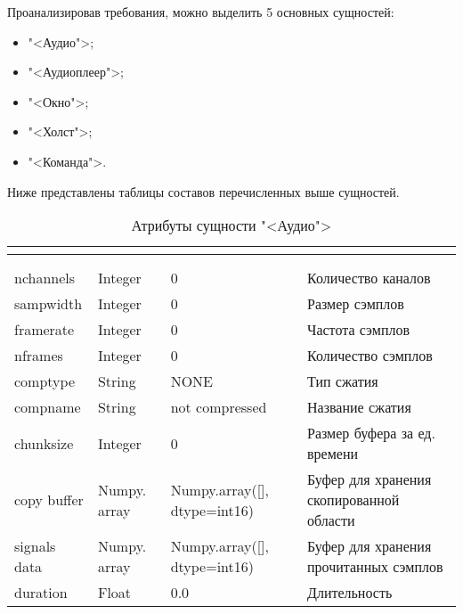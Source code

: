 Проанализировав требования, можно выделить 5 основных сущностей:
\begin{itemize}
	\item "<Аудио">;
	\item "<Аудиоплеер">;
	\item "<Окно">;
	\item "<Холст">;
	\item "<Команда">.
\end{itemize}

Ниже представлены таблицы составов перечисленных выше сущностей.

\begin{xltabular}{\textwidth}{|p{2.1cm}|p{2cm}|l|X|}
	\caption{Атрибуты сущности "<Аудио">}\\ \hline
	\label{news:table}
	 &  &  &  \\ \hline
	 &  &  &  \\ \hline
	\endfirsthead
	 &  &  &  \\ \hline
	\finishhead
	nchannels & Integer & 0 & Количество каналов \\ \hline 
	sampwidth & Integer & 0 & Размер сэмплов \\ \hline 
	framerate & Integer & 0 & Частота сэмплов \\ \hline 
	nframes & Integer & 0 & Количество сэмплов \\ \hline 
	comptype & String & NONE & Тип сжатия \\ \hline 
	compname & String & not compressed & Название сжатия \\ \hline 
	chunksize & Integer & 0 & Размер буфера за ед. времени \\ \hline 
	copy buffer & Numpy. array & Numpy.array([], dtype=int16) & Буфер для хранения скопированной области \\ \hline 
	signals data & Numpy. array & Numpy.array([], dtype=int16) & Буфер для хранения прочитанных сэмплов \\ \hline 
	duration & Float & 0.0 & Длительность
\end{xltabular}

